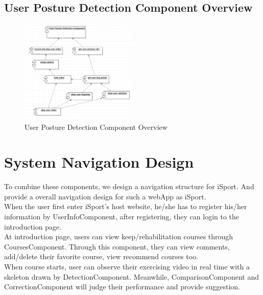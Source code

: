 \documentclass[16pt]{scrreprt}
\begin{document}
\subsection{User Posture Detection Component Overview}
\begin{figure}[H]
  \centering
  \includegraphics[width=0.505\textwidth]{diagrams/detection-com.png}
  \caption{User Posture Detection Component Overview}
\end{figure}

\section{System Navigation Design}
To combine these components, we design a navigation structure for iSport. And provide a overall navigation design for such a webApp as iSport. \\

\noindent When the user first enter iSport's host website, he/she has to register his/her information by UserInfoComponent, after registering, they can login to the introduction page.\\

\noindent At introduction page, users can view keep/rehabilitation courses through CoursesComponent. Through this component, they can view comments, add/delete their favorite course, view recommend courses too.\\

\noindent When course starts, user can observe their exercising video in real time with a skeleton drawn by DetectionComponent. Meanwhile, ComparisonComponent and CorrectionComponent will judge their performance and provide suggestion.\\
\end{document}
